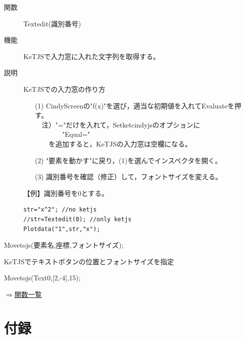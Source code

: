 \documentclass[papersize,a4paper,12pt,uplatex]{jsarticle}
\begin{document}
\begin{description}

\hypertarget{textedit}{}
\item[関数]Textedit(識別番号)
\item[機能]KeTJSで入力窓に入れた文字列を取得する。
\item[説明]KeTJSでの入力窓の作り方

\begin{itemize}
\item[(1)]CindyScreenの"f(x)"を選び，適当な初期値を入れてEvaluateを押す。\\
　注）"="だけを入れて，Setketcindyjsのオプションに\\
　　　　"Equal="\\
　　を追加すると，KeTJSの入力窓は空欄になる。
\item[(2)]"要素を動かす"に戻り，(1)を選んでインスペクタを開く。
\item[(3)]識別番号を確認（修正）して，フォントサイズを変える。

\end{itemize}

【例】識別番号を0とする。

\begin{verbatim}
str="x^2"; //no ketjs
//str=Textedit(0); //only ketjs
Plotdata("1",str,"x");
\end{verbatim}

\end{description}

\begin{description}

\hypertarget{movetojs}{}
\item[関数]Movetojs(要素名,座標,フォントサイズ);
\item[機能]KeTJSでテキストボタンの位置とフォントサイズを指定
\item[例　]Movetojs(Text0,[2,-4],15);

\begin{flushright} \hyperlink{functionlist}{$\Rightarrow$関数一覧}\end{flushright}

\end{description}

\newpage
\section{付録}
\end{document}

